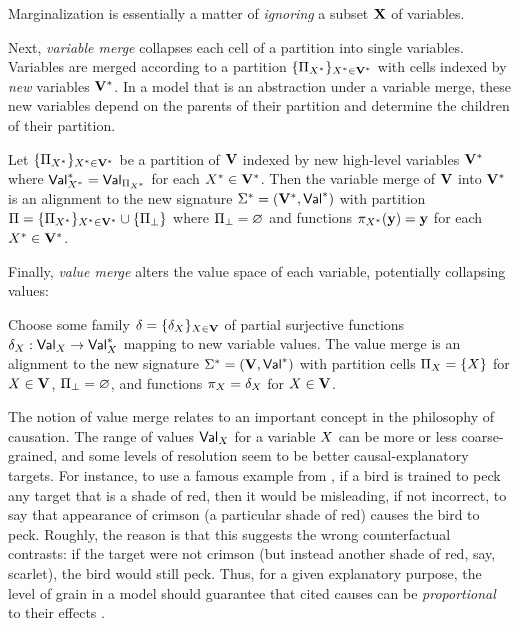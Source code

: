 \documentclass[twoside,11pt]{article}
\begin{document}
Marginalization is essentially a matter of \emph{ignoring} a subset $\mathbf{X}$ of variables. 

Next, \emph{variable merge} collapses each cell of a partition into single variables. Variables are merged according to a partition $\{\Pi_{X^*}\}_{X^* \in \mathbf{V}^*}$ with cells indexed by \textit{new} variables $\mathbf{V}^*$. In a model that is an abstraction under a variable merge, these new variables depend on the parents of their partition and determine the children of their partition.

\begin{definition} \label{def:variable-merge} 
Let $\{\Pi_{X^*}\}_{X^* \in \mathbf{V}^*}$ be a partition of $\mathbf{V}$ indexed by new high-level variables $\mathbf{V}^*$ where $\mathsf{Val}_{X^*}^* = \mathsf{Val}_{\Pi_{X^*}}$ for each $X^* \in \mathbf{V}^*$.
Then the variable merge of $\mathbf{V}$ into $\mathbf{V}^*$ is an alignment to the new signature $\Sigma^* = (\mathbf{V}^*, \mathsf{Val}_{}^*)$ with partition $\Pi = \{\Pi_{X^*}\}_{X^* \in \mathbf{V}^*} \cup \{\Pi_\bot\}$ where $\Pi_\bot = \varnothing$ and functions $\pi_{X^*}(\mathbf{y}) = \mathbf{y}$ for each $X^* \in \mathbf{V}^*$.
\end{definition}

Finally, \emph{value merge} alters the value space of each variable, potentially collapsing values:

\begin{definition}\label{def:value-merge}
Choose some family $\delta = \{\delta_X\}_{X \in \mathbf{V}}$ of partial surjective functions $\delta_X : \mathsf{Val}_{X} \to \mathsf{Val}_{X}^*$ mapping to new variable values. 
The value merge is an alignment to the new signature $\Sigma^* = (\mathbf{V}, \mathsf{Val}_{ }^*)$ 
with partition cells $\Pi_X = \{X\}$ for $X \in \mathbf{V}$, $\Pi_\bot = \varnothing$, and functions $\pi_X = \delta_X$ for $X \in \mathbf{V}$.
\end{definition}

The notion of value merge  relates to an important concept in the philosophy of causation. The range of values $\mathsf{Val}_{X}$ for a variable $X$ can be more or less coarse-grained, and some levels of resolution seem to be better causal-explanatory targets. For instance, to use a famous example from \cite{Yablo}, if a bird is trained to peck any target that is a shade of red, then it would be misleading, if not incorrect, to say that appearance of crimson (a particular shade of red) causes the bird to peck. Roughly, the reason is that this suggests the wrong counterfactual contrasts: if the target were not crimson (but instead another shade of red, say, scarlet), the bird would still peck. Thus, for a given explanatory purpose, the level of grain in a model should guarantee that cited causes can be \emph{proportional} to their effects \citep{Yablo,Woodward2021}.
\end{document}
